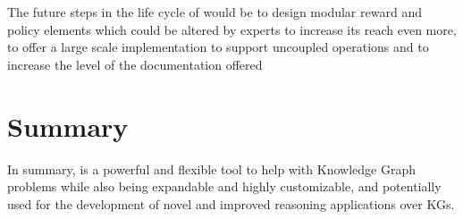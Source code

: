 The future steps in the life cycle of \toolname{} would be to design modular reward and policy elements which could be altered by experts to increase its reach even more, to offer a large scale implementation to support uncoupled operations and to increase the level of the documentation offered


\section{Summary}\label{sec:framework-summary}

In summary, \toolname{} is a powerful and flexible tool to help with Knowledge Graph problems while also being expandable and highly customizable, and potentially used for the development of novel and improved reasoning applications over KGs.